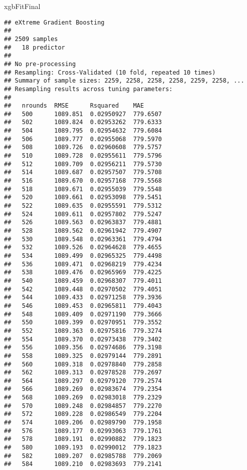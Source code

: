 \documentclass[
]{article}
\newenvironment{Shaded}{\begin{snugshade}}{\end{snugshade}}
\newcommand{\NormalTok}[1]{#1}
\begin{document}
\begin{Shaded}
\begin{Highlighting}[]
\NormalTok{xgbFitFinal}
\end{Highlighting}
\end{Shaded}

\begin{verbatim}
## eXtreme Gradient Boosting 
## 
## 2509 samples
##   18 predictor
## 
## No pre-processing
## Resampling: Cross-Validated (10 fold, repeated 10 times) 
## Summary of sample sizes: 2259, 2258, 2258, 2258, 2259, 2258, ... 
## Resampling results across tuning parameters:
## 
##   nrounds  RMSE      Rsquared    MAE     
##   500      1089.851  0.02950927  779.6507
##   502      1089.824  0.02953262  779.6333
##   504      1089.795  0.02954632  779.6084
##   506      1089.777  0.02955068  779.5970
##   508      1089.726  0.02960608  779.5757
##   510      1089.728  0.02955611  779.5796
##   512      1089.709  0.02956211  779.5730
##   514      1089.687  0.02957507  779.5708
##   516      1089.670  0.02957168  779.5568
##   518      1089.671  0.02955039  779.5548
##   520      1089.661  0.02953098  779.5451
##   522      1089.635  0.02955591  779.5312
##   524      1089.611  0.02957802  779.5247
##   526      1089.563  0.02963837  779.4881
##   528      1089.562  0.02961942  779.4907
##   530      1089.548  0.02963361  779.4794
##   532      1089.526  0.02964628  779.4655
##   534      1089.499  0.02965325  779.4498
##   536      1089.471  0.02968219  779.4234
##   538      1089.476  0.02965969  779.4225
##   540      1089.459  0.02968307  779.4011
##   542      1089.448  0.02970502  779.4051
##   544      1089.433  0.02971258  779.3936
##   546      1089.453  0.02965811  779.4043
##   548      1089.409  0.02971190  779.3666
##   550      1089.399  0.02970951  779.3552
##   552      1089.363  0.02975816  779.3274
##   554      1089.370  0.02973438  779.3402
##   556      1089.356  0.02974686  779.3198
##   558      1089.325  0.02979144  779.2891
##   560      1089.318  0.02978840  779.2858
##   562      1089.313  0.02978528  779.2697
##   564      1089.297  0.02979120  779.2574
##   566      1089.269  0.02983674  779.2354
##   568      1089.269  0.02983018  779.2329
##   570      1089.248  0.02984857  779.2270
##   572      1089.228  0.02986549  779.2204
##   574      1089.206  0.02989790  779.1958
##   576      1089.177  0.02993063  779.1761
##   578      1089.191  0.02990882  779.1823
##   580      1089.193  0.02990012  779.1823
##   582      1089.207  0.02985788  779.2069
##   584      1089.210  0.02983693  779.2141

\end{verbatim}
\end{document}
